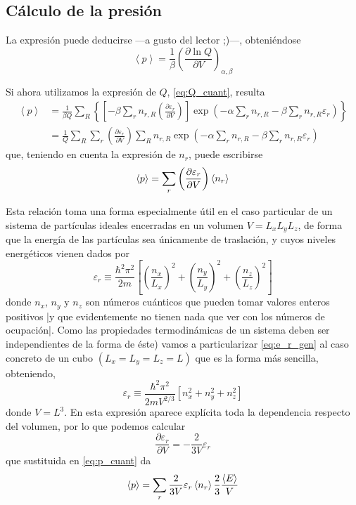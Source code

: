 \subsection*{Cálculo de la presión}

La expresión puede deducirse ---a gusto del lector ;)---, obteniéndose
\begin{equation}
	\left\langle p \right\rangle = \frac{1}{\beta} \left( \frac{\partial \ln Q}{\partial V} \right)_{\alpha, \beta}
\end{equation}

Si ahora utilizamos la expresión de $Q$, \eqref{eq:Q_cuant}, resulta
\begin{align*}
	\left\langle p \right\rangle &= \frac{1}{\beta Q} \sum_R \left\lbrace \left[ -\beta \sum_r n_{r,R} \left( \frac{\partial \varepsilon_r}{\partial V} \right) \right] \exp \left( -\alpha \sum_r n_{r,R} -\beta \sum_r n_{r,R} \varepsilon_r \right)  \right\rbrace \\
	&= \frac{1}{Q} \sum_R  \sum_r \left( \frac{\partial \varepsilon_r}{\partial V} \right) \sum_R n_{r,R} \exp \left( -\alpha \sum_r n_{r,R} -\beta \sum_r n_{r,R} \varepsilon_r \right)
\end{align*}
que, teniendo en cuenta la expresión de $n_r$, puede escribirse
\begin{equation}\label{eq:p_cuant}
	\left\langle p \right\rangle = \sum_r \left( \frac{\partial \varepsilon_r}{\partial V} \right) \expval{n_r} 
\end{equation}

Esta relación toma una forma especialmente útil en el caso particular de un sistema de partículas ideales encerradas en un volumen $V = L_xL_yL_z$, de forma que la energía de las partículas sea únicamente de traslación, y cuyos niveles energéticos vienen dados por
\begin{equation}\label{eq:e_r_gen}
	\varepsilon_r \equiv \frac{\hbar^2 \pi^2}{2m} \left[\left( \frac{n_x}{L_x} \right)^2 + \left( \frac{n_y}{L_y} \right)^2 + \left( \frac{n_z}{L_z} \right)^2 \right] 
\end{equation}
donde $n_x$, $n_y$ y $n_z$ son números cuánticos que pueden tomar valores enteros positivos |y que evidentemente no tienen nada que ver con los números de ocupación|.
Como las propiedades termodinámicas de un sistema deben ser independientes de la forma de éste) vamos a particularizar \eqref{eq:e_r_gen} al caso concreto de un cubo $(L_x = L_y = L_z = L)$ que es la forma más sencilla, obteniendo,
\begin{equation}
\varepsilon_r \equiv \frac{\hbar^2 \pi^2}{2mV^{2/3}} \left[ n_x^2 + n_y^2 + n_z^2 \right] 
\end{equation}
donde $V = L^3$.
En esta expresión aparece explícita toda la dependencia respecto del volumen, por lo que podemos calcular
$$\frac{\partial \varepsilon_r}{\partial V} = - \frac{2}{3 V} \varepsilon_r$$
que sustituida en \eqref{eq:p_cuant} da
$$\left\langle p \right\rangle = \sum_r \frac{2}{3 V} \varepsilon_r \expval{n_r} \frac{2}{3} \frac{\left\langle E \right\rangle}{V}$$

